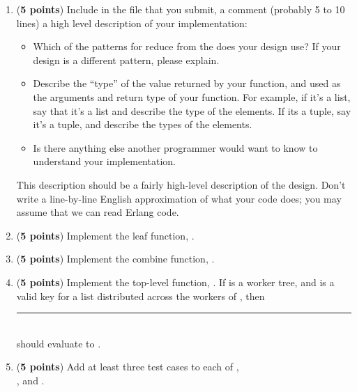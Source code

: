 \documentclass{article}
\begin{document}
\begin{enumerate}
    \begin{enumerate}
      \item (\textbf{5 points})
	Include in the  file that you submit, a comment (probably 5 to 10 lines)
	a high level description of your implementation:
	\begin{itemize}
	  \item Which of the patterns for reduce from the
	    does your design use?
	    If your design is a different pattern, please explain.
	  \item Describe the ``type'' of the value returned by your  function,
	    and used as the arguments and return type of your  function.  For
	    example, if it's a list, say that it's a list and describe the type of the elements.
	    If its a tuple, say it's a tuple, and describe the types of the elements.
	  \item Is there anything else another programmer would want to know to understand
	    your implementation.
	\end{itemize}
	This description should be a fairly high-level description of the design.
	Don't write a line-by-line English approximation of what your code does;
	you may assume that we can read Erlang code.

      \item (\textbf{5 points})
	Implement the leaf function, .

      \item (\textbf{5 points})
	Implement the combine function, .

      \item (\textbf{5 points})
	Implement the top-level function, .
	If  is a worker tree, and  is a valid key for
	a list distributed across the workers of , then\\
	\rule{1.5em}{0ex}\\
	should evaluate to .

      \item (\textbf{5 points})
	Add at least three test cases to each of
	,\\
	, and
	.


\end{enumerate}
\end{enumerate}
\end{document}
